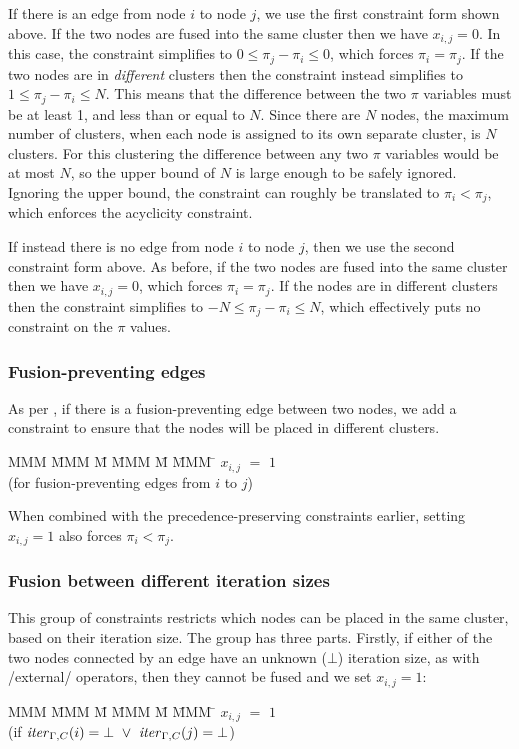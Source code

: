 If there is an edge from node $i$ to node $j$, we use the first constraint form shown above.
If the two nodes are fused into the same cluster then we have $x_{i,j} = 0$.
In this case, the constraint simplifies to $0 \le \pi_j - \pi_i \le 0$, which forces $\pi_i = \pi_j$.
If the two nodes are in \emph{different} clusters then the constraint instead simplifies to $1 \le \pi_j - \pi_i \le N$.
This means that the difference between the two $\pi$ variables must be at least 1, and less than or equal to $N$.
Since there are $N$ nodes, the maximum number of clusters, when each node is assigned to its own separate cluster, is $N$ clusters.
For this clustering the difference between any two $\pi$ variables would be at most $N$, so the upper bound of $N$ is large enough to be safely ignored.
Ignoring the upper bound, the constraint can roughly be translated to $\pi_i < \pi_j$, which enforces the acyclicity constraint.

If instead there is no edge from node $i$ to node $j$, then we use the second constraint form above.
As before, if the two nodes are fused into the same cluster then we have $x_{i,j} = 0$, which forces $\pi_i = \pi_j$.
If the nodes are in different clusters then the constraint simplifies to $-N \le \pi_j - \pi_i \le N$, which effectively puts no constraint on the $\pi$ values.


\subsubsection{Fusion-preventing edges}
As per \citet{megiddo1998optimal}, if there is a fusion-preventing edge between two nodes, we add a constraint to ensure that the nodes will be placed in different clusters.
\begin{tabbing}
MMM     \= MMM \= M  \= MMM \= M \= MMM \= \kill
        \> $x_{i,j}$ \> $=$ \> $1$ \>   \> \\
        \> (for fusion-preventing edges from $i$ to $j$) 
\end{tabbing}

When combined with the precedence-preserving constraints earlier, setting $x_{i,j} = 1$ also forces $\pi_i < \pi_j$. 


\subsubsection{Fusion between different iteration sizes}
This group of constraints restricts which nodes can be placed in the same cluster, based on their iteration size.
The group has three parts. 
Firstly, if either of the two nodes connected by an edge have an unknown ($\bot$) iteration size, as with \Hs/external/ operators, then they cannot be fused and we set $x_{i,j} = 1$:
\begin{tabbing}
MMM     \= MMM \= M \= MMM \= M \= MMM \= \kill
        \> $x_{i,j}$   \> $=$   \> $1$          \>       \>     \\
        \> (if $\mathit{iter}_{\Gamma,C}(i) = \bot 
                ~\vee~ \mathit{iter}_{\Gamma,C}(j) = \bot$)
\end{tabbing}

